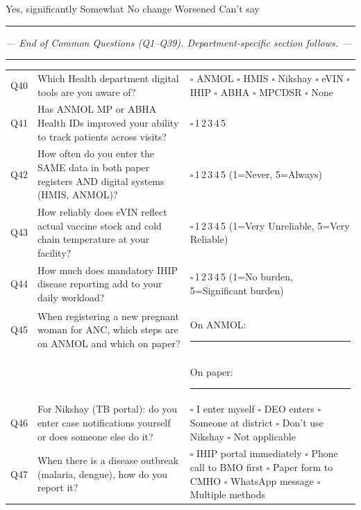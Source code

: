 \documentclass[10pt,a4paper]{article}
\newcommand{\likert}{{\Large$\square$}\,1\quad{\Large$\square$}\,2\quad{\Large$\square$}\,3\quad{\Large$\square$}\,4\quad{\Large$\square$}\,5}
\begin{document}
\noindent {\Large$\square$} Yes, significantly\quad{\Large$\square$} Somewhat\quad{\Large$\square$} No change\quad{\Large$\square$} Worsened\quad{\Large$\square$} Can't say

\vspace{4pt}\noindent\rule{\textwidth}{1pt}\vspace{2pt}
\begin{center}\textit{--- End of Common Questions (Q1--Q39). Department-specific section follows. ---}\end{center}
\rule{\textwidth}{0.5pt}
\newpage
{}\vspace{4pt}

\noindent\begin{tabularx}{\textwidth}{@{}L{0.6cm} X L{5.5cm}@{}}
Q40 & Which Health department digital tools are you aware of? & {\Large$\square$} ANMOL {\Large$\square$} HMIS {\Large$\square$} Nikshay {\Large$\square$} eVIN {\Large$\square$} IHIP {\Large$\square$} ABHA {\Large$\square$} MPCDSR {\Large$\square$} None \\[3pt]
Q41 & Has ANMOL MP or ABHA Health IDs improved your ability to track patients across visits? & \likert \\[3pt]
Q42 & How often do you enter the SAME data in both paper registers AND digital systems (HMIS, ANMOL)? & \likert{} {\scriptsize(1=Never, 5=Always)} \\[3pt]
Q43 & How reliably does eVIN reflect actual vaccine stock and cold chain temperature at your facility? & \likert{} {\scriptsize(1=Very Unreliable, 5=Very Reliable)} \\[3pt]
Q44 & How much does mandatory IHIP disease reporting add to your daily workload? & \likert{} {\scriptsize(1=No burden, 5=Significant burden)} \\[3pt]
Q45 & When registering a new pregnant woman for ANC, which steps are on ANMOL and which on paper? & On ANMOL: \rule{6cm}{0.4pt}\\[2pt] && On paper: \rule{6cm}{0.4pt} \\[3pt]
Q46 & For Nikshay (TB portal): do you enter case notifications yourself or does someone else do it? & {\Large$\square$} I enter myself {\Large$\square$} DEO enters {\Large$\square$} Someone at district {\Large$\square$} Don't use Nikshay {\Large$\square$} Not applicable \\[3pt]
Q47 & When there is a disease outbreak (malaria, dengue), how do you report it? & {\Large$\square$} IHIP portal immediately {\Large$\square$} Phone call to BMO first {\Large$\square$} Paper form to CMHO {\Large$\square$} WhatsApp message {\Large$\square$} Multiple methods \\[3pt]

\end{tabularx}
\end{document}
